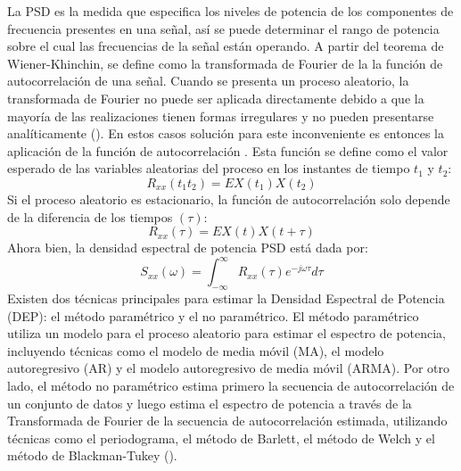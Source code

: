 La PSD es la medida que especifica los niveles de potencia de los componentes de frecuencia presentes en una señal, así se puede determinar el rango de potencia sobre el cual las frecuencias de la señal están operando. A partir del teorema de Wiener-Khinchin, se define como la transformada de Fourier de la la función de autocorrelación de una señal. Cuando se presenta un proceso aleatorio, la transformada de Fourier no puede ser aplicada directamente debido a que la mayoría de las realizaciones tienen formas irregulares y no pueden presentarse analíticamente (\cite{HerreraSepulveda_2017}). En estos casos solución para este inconveniente es entonces la aplicación de la función de autocorrelación . Esta función se define como el valor esperado de las variables aleatorias del proceso en los instantes de tiempo $t_1$ y $t_2$:
\begin{equation}
    R_{xx}(t_1 t_2) = E{X(t_1)X(t_2)}
\end{equation}
Si el proceso aleatorio es estacionario, la función de autocorrelación solo depende de la diferencia de los tiempos $(\tau)$:
\begin{equation}
    R_{xx}(\tau) = E{X(t)X(t+\tau)}
\end{equation}
Ahora bien, la densidad espectral de potencia PSD está dada por:
\begin{equation}
   S_{xx}(\omega) = \int_{-\infty}^{\infty} R_{xx}(\tau) e^{-j\omega\tau} d\tau
\end{equation}
Existen dos técnicas principales para estimar la Densidad Espectral de Potencia (DEP): el método paramétrico y el no paramétrico. El método paramétrico utiliza un modelo para el proceso aleatorio para estimar el espectro de potencia, incluyendo técnicas como el modelo de media móvil (MA), el modelo autoregresivo (AR) y el modelo autoregresivo de media móvil (ARMA). Por otro lado, el método no paramétrico estima primero la secuencia de autocorrelación de un conjunto de datos y luego estima el espectro de potencia a través de la Transformada de Fourier de la secuencia de autocorrelación estimada, utilizando técnicas como el periodograma, el método de Barlett, el método de Welch y el método de Blackman-Tukey (\cite{HerreraSepulveda_2017}).
